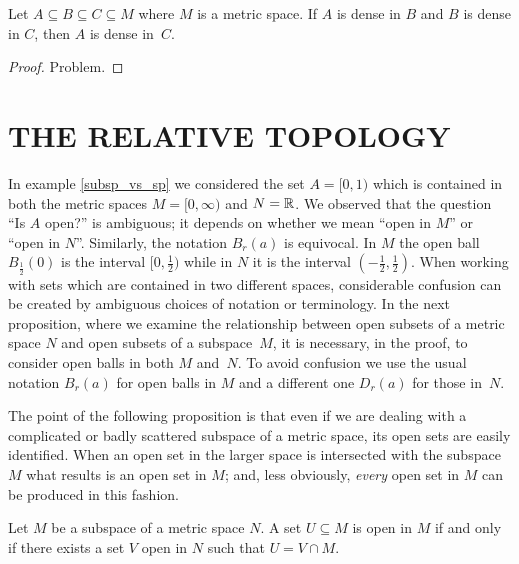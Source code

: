 \begin{prop} Let $A \subseteq B \subseteq C \subseteq M$ where $M$ is a metric space. If $A$
is dense in $B$ and $B$ is dense in $C$, then $A$ is dense in~$C$.
\end{prop}

\begin{proof} Problem.  \ns  \end{proof}






\section{THE RELATIVE TOPOLOGY}
In example \ref{subsp_vs_sp} we considered the set $A = [0,1)$ which is contained in both the
metric spaces  $M = [0,\infty)$ and $N = \mathbb{R}$.  We observed that the question ``Is $A$ open?''
is ambiguous; it depends on whether we mean ``open in $M$'' or ``open in $N$''. Similarly, the
notation $B_r(a)$ is equivocal.  In $M$ the open ball $B_\frac12(0)$ is the interval
$[0,\frac12)$ while in $N$ it is the interval $(-\frac12,\frac12)$.  When working with sets
which are contained in two different spaces, considerable confusion can be created by
ambiguous choices of notation or terminology.  In the next proposition, where we examine the
relationship between open subsets of a metric space $N$ and open subsets of a subspace~$M$, it
is necessary, in the proof, to consider open balls in both $M$ and~$N$.  To avoid confusion we
use the usual notation $B_r(a)$ for open balls in $M$ and a different one $D_r(a)$ for those
in~$N$.

The point of the following proposition is that even if we are dealing with a complicated or
badly scattered subspace of a metric space, its open sets are easily identified. When an open
set in the larger space is intersected with the subspace $M$ what results is an open set in
$M$; and, less obviously, \emph{every} open set in $M$ can be produced in this fashion.

\begin{prop}\label{open_in_subsp} Let $M$ be a subspace of a metric space $N$.  A set
$U \subseteq M$ is open in $M$ if and only if there exists a set $V$ open in $N$ such that $U
= V \cap M$.
\end{prop}


